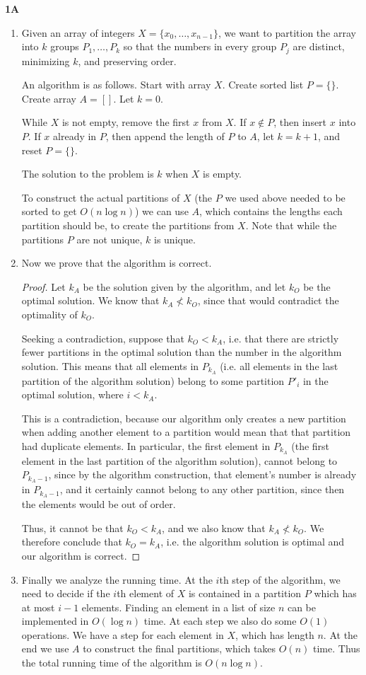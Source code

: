 \documentclass[11pt]{article}
\begin{document}
\textbf{1A}

\begin{enumerate}
\item Given an array of integers $X = \{x_0, \dots, x_{n-1}\}$, we want to partition the array into $k$ groups $P_1, \dots, P_k$ so that the numbers in every group $P_j$ are distinct, minimizing $k$, and preserving order. 

An algorithm is as follows. Start with array $X$. Create sorted list $P = \{ \}$. Create array $A = []$. Let $k = 0$. 

While $X$ is not empty, remove the first $x$ from $X$. If $x \notin P$, then insert $x$ into $P$. If $x$ already in $P$, then append the length of $P$ to $A$, let $k = k+1$, and reset $P = \{ \}$. 

The solution to the problem is $k$ when $X$ is empty. 

To construct the actual partitions of $X$ (the $P$ we used above needed to be sorted to get $O(n\log n)$) we can use $A$, which contains the lengths each partition should be, to create the partitions from $X$. Note that while the partitions $P$ are not unique, $k$ is unique. 

\item Now we prove that the algorithm is correct. 
\begin{proof}
Let $k_A$ be the solution given by the algorithm, and let $k_O$ be the optimal solution. We know that $k_A \not< k_O$, since that would contradict the optimality of $k_O$. 

Seeking a contradiction, suppose that $k_O < k_A$, i.e. that there are strictly fewer partitions in the optimal solution than the number in the algorithm solution. This means that all elements in $P_{k_A}$ (i.e. all elements in the last partition of the algorithm solution) belong to some partition $P'_{i}$ in the optimal solution, where $i < k_A$. 

This is a contradiction, because our algorithm only creates a new partition when adding another element to a partition would mean that that partition had duplicate elements. In particular, the first element in $P_{k_A}$ (the first element in the last partition of the algorithm solution), cannot belong to $P_{k_A-1}$, since by the algorithm construction, that element's number is already in $P_{k_A-1}$, and it certainly cannot belong to any other partition, since then the elements would be out of order. 

Thus, it cannot be that $k_O<k_A$, and we also know that $k_A \not < k_O$. We therefore conclude that $k_O = k_A$, i.e. the algorithm solution is optimal and our algorithm is correct.
\end{proof}
\item Finally we analyze the running time. At the $i$th step of the algorithm, we need to decide if the $i$th element of $X$ is contained in a partition $P$ which has at most $i-1$ elements. Finding an element in a list of size $n$ can be implemented in $O(\log n)$ time. At each step we also do some $O(1)$ operations. We have a step for each element in $X$, which has length $n$. At the end we use $A$ to construct the final partitions, which takes $O(n)$ time. Thus the total running time of the algorithm is $O(n\log n)$. 
\end{enumerate}
\end{document}
